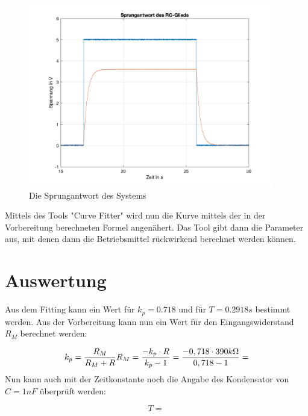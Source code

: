 \documentclass{report}
\begin{document}
\begin{figure}[h]
  \begin{center}
    \includegraphics[width=0.95\textwidth]{assets/img/step_response.png}
  \end{center}
  \caption{Die Sprungantwort des Systems}
  \label{fig:step_resp}
\end{figure}

Mittels des Tools "Curve Fitter" wird nun die Kurve mittels der in der Vorbereitung berechneten Formel angenähert. Das Tool gibt dann die Parameter aus, mit denen dann die Betriebsmittel rückwirkend berechnet werden können.

\section{Auswertung}

Aus dem Fitting kann ein Wert für $k_p = 0.718$ und für $T = 0.2918s$ bestimmt werden. Aus der Vorbereitung kann nun ein Wert für den Eingangswiderstand $R_M$ berechnet werden:

\begin{equation}
  k_p = \frac{R_M}{R_M + R}\\
  R_M = \frac{-k_p\cdot R}{k_p-1} = \frac{-0,718 \cdot 390k\Omega}{0,718-1} = 
  \label{eq:rm}
\end{equation}
Nun kann auch mit der Zeitkonstante noch die Angabe des Kondensator von $C = 1nF$ überprüft werden:

\begin{equation}
  T = \frac{}{} 
  \label{eq:kondensator_ueberpruefen}
\end{equation}
\end{document}
